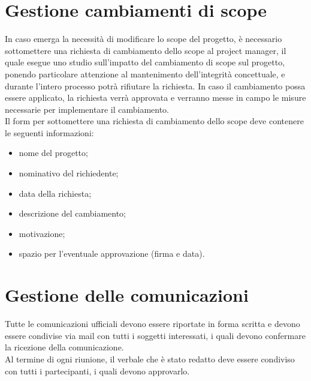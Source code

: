 \documentclass[a4paper,12pt]{article}
\begin{document}
\section{Gestione cambiamenti di scope}
In caso emerga la necessità di modificare lo scope del progetto, è necessario sottomettere una richiesta di cambiamento
dello scope al project manager, il quale esegue uno studio sull'impatto del cambiamento di scope sul progetto, ponendo
particolare attenzione al mantenimento dell'integrità concettuale, e durante l'intero processo potrà rifiutare la
richiesta. In caso il cambiamento possa essere applicato, la richiesta verrà approvata e verranno messe in campo le
misure necessarie per implementare il cambiamento.\\
Il form per sottomettere una richiesta di cambiamento dello scope deve contenere le seguenti informazioni:
\begin{itemize}
    \item nome del progetto;
    \item nominativo del richiedente;
    \item data della richiesta;
    \item descrizione del cambiamento;
    \item motivazione;
    \item spazio per l'eventuale approvazione (firma e data).
\end{itemize}

\section{Gestione delle comunicazioni}
Tutte le comunicazioni ufficiali devono essere riportate in forma scritta e devono essere condivise via mail con tutti
i soggetti interessati, i quali devono confermare la ricezione della comunicazione.\\
Al termine di ogni riunione, il verbale che è stato redatto deve essere condiviso con tutti i partecipanti, i quali
devono approvarlo.

\end{document}
